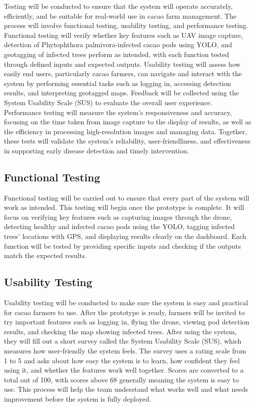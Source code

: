 Testing will be conducted to ensure that the system will operate accurately, efficiently, and be suitable for real-world use in cacao farm management. The process will involve functional testing, usability testing, and performance testing. Functional testing will verify whether key features such as UAV image capture, detection of Phytophthora palmivora-infected cacao pods using YOLO, and geotagging of infected trees perform as intended, with each function tested through defined inputs and expected outputs. Usability testing will assess how easily end users, particularly cacao farmers, can navigate and interact with the system by performing essential tasks such as logging in, accessing detection results, and interpreting geotagged maps. Feedback will be collected using the System Usability Scale (SUS) to evaluate the overall user experience. Performance testing will measure the system’s responsiveness and accuracy, focusing on the time taken from image capture to the display of results, as well as the efficiency in processing high-resolution images and managing data. Together, these tests will validate the system’s reliability, user-friendliness, and effectiveness in supporting early disease detection and timely intervention.

\subsection{Functional Testing}

Functional testing will be carried out to ensure that every part of the system will work as intended. This testing will begin once the prototype is complete. It will focus on verifying key features such as capturing images through the drone, detecting healthy and infected cacao pods using the YOLO, tagging infected trees’ locations with GPS, and displaying results clearly on the dashboard. Each function will be tested by providing specific inputs and checking if the outputs match the expected results.

\subsection{Usability Testing}

Usability testing will be conducted to make sure the system is easy and practical for cacao farmers to use. After the prototype is ready, farmers will be invited to try important features such as logging in, flying the drone, viewing pod detection results, and checking the map showing infected trees. After using the system, they will fill out a short survey called the System Usability Scale (SUS), which measures how user-friendly the system feels. The survey uses a rating scale from 1 to 5 and asks about how easy the system is to learn, how confident they feel using it, and whether the features work well together. Scores are converted to a total out of 100, with scores above 68 generally meaning the system is easy to use. This process will help the team understand what works well and what needs improvement before the system is fully deployed.
\pagebreak

